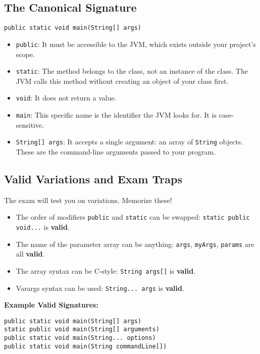 \documentclass[12pt]{article}
\begin{document}
\begin{enumerate}[label=(\arabic*)]
\subsection{The Canonical Signature}
\begin{verbatim}
public static void main(String[] args)
\end{verbatim}
\begin{itemize}
    \item \texttt{public}: It must be accessible to the JVM, which exists outside your project's scope.
    \item \texttt{static}: The method belongs to the class, not an instance of the class. The JVM calls this method without creating an object of your class first.
    \item \texttt{void}: It does not return a value.
    \item \texttt{main}: This specific name is the identifier the JVM looks for. It is case-sensitive.
    \item \texttt{String[] args}: It accepts a single argument: an array of \texttt{String} objects. These are the command-line arguments passed to your program.
\end{itemize}

\subsection{Valid Variations and Exam Traps}
The exam will test you on variations. Memorize these!
\begin{itemize}
    \item The order of modifiers \texttt{public} and \texttt{static} can be swapped: \texttt{static public void...} is \textbf{valid}.
    \item The name of the parameter array can be anything: \texttt{args}, \texttt{myArgs}, \texttt{params} are all \textbf{valid}.
    \item The array syntax can be C-style: \texttt{String args[]} is \textbf{valid}.
    \item Varargs syntax can be used: \texttt{String... args} is \textbf{valid}.
\end{itemize}

\textbf{Example Valid Signatures:}
\begin{verbatim}
public static void main(String[] args)
static public void main(String[] arguments)
public static void main(String... options)
public static void main(String commandLine[])
\end{verbatim}


\end{enumerate}
\end{document}
